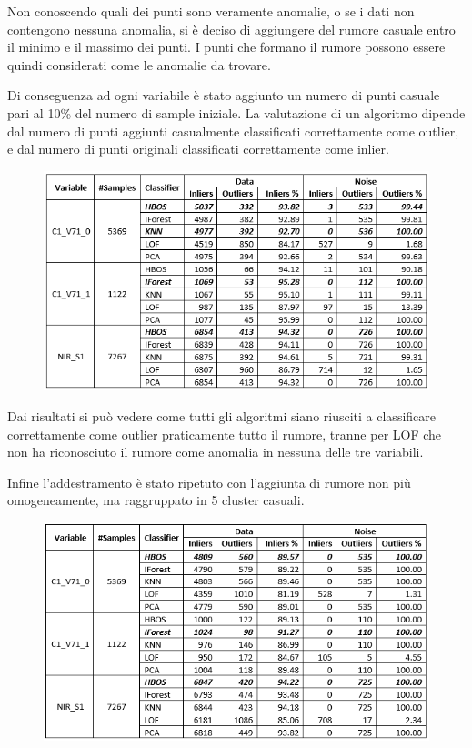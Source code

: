 Non conoscendo quali dei punti sono veramente anomalie, o se i dati non contengono nessuna anomalia, si è deciso di aggiungere del rumore casuale entro il minimo e il massimo dei punti. I punti che formano il rumore possono essere quindi considerati come le anomalie da trovare. 

Di conseguenza ad ogni variabile è stato aggiunto un numero di punti casuale pari al 10\% del numero di sample iniziale. La valutazione di un algoritmo dipende dal numero di punti aggiunti casualmente classificati correttamente come outlier, e dal numero di punti originali classificati correttamente come inlier.

\begin{figure} [H]
	\includegraphics[width=\textwidth]{figures/homogeneous_noise}
		
\end{figure}

Dai risultati si può vedere come tutti gli algoritmi siano riusciti a classificare correttamente come outlier praticamente tutto il rumore, tranne per LOF che non ha riconosciuto il rumore come anomalia in nessuna delle tre variabili.

Infine l'addestramento è stato ripetuto con l'aggiunta di rumore non più omogeneamente, ma raggruppato in 5 cluster casuali.

\begin{figure} [H]
	\includegraphics[width=\textwidth]{figures/cluster_noise}
	
\end{figure}

